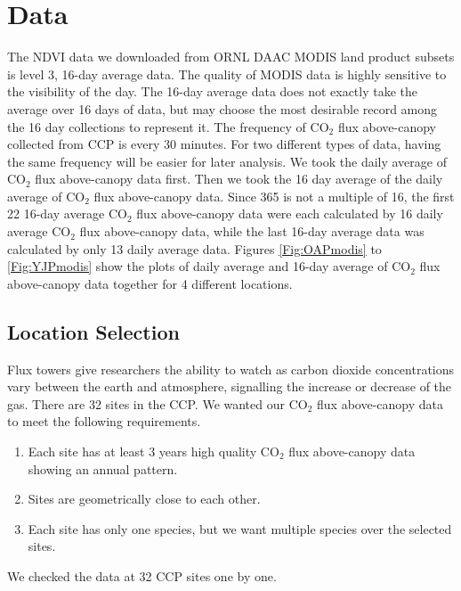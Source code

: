 \documentclass{article}\usepackage[]{graphicx}\usepackage[]{color}
\begin{document}
\section{Data}\label{Sec:Data}

The NDVI data we downloaded from ORNL DAAC MODIS land product subsets is level 3, 16-day average data. The quality of MODIS data is highly sensitive to the visibility of the day. The 16-day average data does not exactly take the average over 16 days of data, but may choose the most desirable record among the 16 day collections to represent it. 
The frequency of CO$_2$ flux above-canopy collected from CCP is every 30 minutes. For two different types of data, having the same frequency will be easier for later analysis. We took the daily average of CO$_2$ flux above-canopy data first. Then we took the 16 day average of the daily average of CO$_2$ flux above-canopy data. Since 365 is not a multiple of 16, the first 22 16-day average CO$_2$ flux above-canopy data were each calculated by 16 daily average CO$_2$ flux above-canopy data, while the last 16-day average data was calculated by only 13 daily average data. Figures \ref{Fig:OAPmodis} to \ref{Fig:YJPmodis} show the plots of daily average and 16-day average of CO$_2$ flux above-canopy data together for 4 different locations.

\subsection{Location Selection}

Flux towers give researchers the ability to watch as carbon dioxide concentrations vary between the earth and atmosphere, signalling the increase or decrease of the gas.
There are 32 sites in the CCP. We wanted our CO$_2$ flux above-canopy data to meet the following requirements.

\begin{enumerate}
\item Each site has at least 3 years high quality CO$_2$ flux above-canopy data showing an annual pattern.
\item Sites are geometrically close to each other.
\item Each site has only one species, but we want multiple species over the selected sites.
\end{enumerate}

We checked the data at 32 CCP sites one by one.
\end{document}
